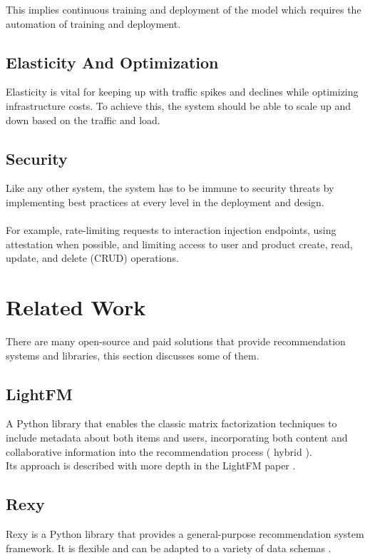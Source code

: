 This implies continuous training and deployment of the model which requires the automation of training and deployment.

\subsection{Elasticity And Optimization}

Elasticity is vital for keeping up with traffic spikes and declines while optimizing infrastructure costs. To achieve this, the system should be able to scale up and down based on the traffic and load.

\subsection{Security}

Like any other system, the system has to be immune to security threats by implementing best practices at every level in the deployment and design. \\ \\
For example, rate-limiting requests to interaction injection endpoints, using attestation when possible, and limiting access to user and product create, read, update, and delete (CRUD) operations.
 
\section{Related Work}

There are many open-source and paid solutions that provide recommendation systems and libraries, this section discusses some of them.

\subsection{LightFM}
A Python library that enables the classic matrix factorization techniques to include metadata about both items and users, incorporating both content and collaborative information into the recommendation process ( hybrid )\cite{LightFM}.  \\

Its approach is described with more depth in the LightFM paper \cite{kula2015metadata}.

\subsection{Rexy}
Rexy \cite{Rexy} is a Python library that provides a general-purpose recommendation system framework. It is flexible and can be adapted to a variety of data schemas \cite{Rexy}.

